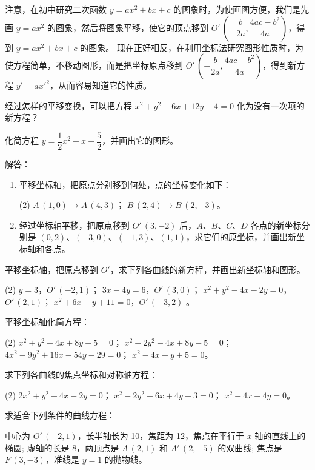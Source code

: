 \bigskip
注意，在初中研究二次函数 $y=ax^2+bx+c$ 的图象时，为使画图方便，我们是先画 $y=ax^2$ 的图象，然后将图象平移，使它的顶点移到 $O'\,\left(-\dfrac{b}{2a},\dfrac{4ac-b^2}{4a}\right)$，得到 $y=ax^2+bx+c$ 的图象。
现在正好相反，在利用坐标法研究图形性质时，为使方程简单，不移动图形，而是把坐标原点移到 $O'\,\left(-\dfrac{b}{2a},\dfrac{4ac-b^2}{4a}\right)$，得到新方程 $y'=ax'^2$，从而容易知道它的性质。

\begin{Practice}
  \begin{question}
    \item 经过怎样的平移变换，可以把方程 $x^2+y^2-6x+12y-4=0$ 化为没有一次项的新方程？
    \item 化简方程 $y=\dfrac{1}{2}x^2+x+\dfrac{5}{2}$，并画出它的图形。
  \end{question}
\end{Practice}
\begin{Exercise}
  \begin{question}
    \item 解答：
    \begin{enumerate}[itemindent=2em]
      \item 平移坐标轴，把原点分别移到何处，点的坐标变化如下：
      \begin{tasks}(2)
        \task $A\,(1,0)\to A\,(4,3)$；
        \task $B\,(2,4)\to B\,(2,-3)$。
      \end{tasks}
      \item 经过坐标轴平移，把原点移到 $O'\,(3,-2)$ 后，$A$、$B$、$C$、$D$ 各点的新坐标分别是 $(0,2)$、$(-3,0)$、$(-1,3)$、$(1,1)$，求它们的原坐标，并画出新坐标轴和各点。
    \end{enumerate}
    \item 平移坐标轴，把原点移到 $O'$，求下列各曲线的新方程，并画出新坐标轴和图形。
    \begin{tasks}(2)
      \task $y=3$，$O'\,(-2,1)$；
      \task $3x-4y=6$，$O'\,(3,0)$；
      \task $x^2+y^2-4x-2y=0$，$O'\,(2,1)$；
      \task $x^2+6x-y+11=0$，$O'\,(-3,2)$ 。
    \end{tasks}
    \item 平移坐标轴化简方程：
    \begin{tasks}(2)
      \task $x^2+y^2+4x+8y-5=0$；
      \task $x^2+2y^2-4x+8y-5=0$；
      \task $4x^2-9y^2+16x-54y-29=0$；
      \task $x^2-4x-y+5=0$。
    \end{tasks}
    \item 求下列各曲线的焦点坐标和对称轴方程：
    \begin{tasks}(2)
      \task $2x^2+y^2-4x-2y=0$；
      \task $x^2-2y^2-6x+4y+3=0$；
      \task $x^2-4x+4y=0$。
    \end{tasks}
    \item 求适合下列条件的曲线方程：
    \begin{tasks}
      \task 中心为 $O'\,(-2,1)$，长半轴长为 10，焦距为 12，焦点在平行于 $x$ 轴的直线上的椭圆;
      \task 虚轴的长是 8，两顶点是 $A\,(2,1)$ 和 $A'\,(2,-5)$ 的双曲线;
      \task 焦点是 $F\,(3,-3)$，准线是 $y=1$ 的抛物线。
    \end{tasks}
  \end{question}
\end{Exercise}

